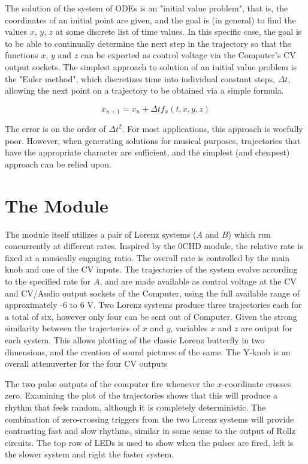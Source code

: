\documentclass{tufte-handout}
\begin{document}
The solution of the system of ODEs is an "initial value problem", that is, the coordinates of an initial point are given, and the goal is (in general) to find the values $x$, $y$, $z$ at some discrete list of time values. In this specific case, the goal is to be able to continually determine the next step in the trajectory so that the functions $x$, $y$ and $z$ can be exported as control voltage via the Computer's CV output sockets.
The simplest approach to solution of an initial value problem is the "Euler method", which discretizes time into individual constant steps, $\Delta t$, allowing the next point on a trajectory to be obtained via a simple formula.

$$x_{n+1} = x_n + \Delta t f_{x}(t, x, y, z)$$

The error is on the order of ${\Delta t}^2$. For most applications, this approach is woefully poor. However, when generating solutions for musical purposes, trajectories that have the appropriate character are sufficient, and the simplest (and cheapest) approach can be relied upon.

\section{The Module}\label{sec:the_module}

The module itself utilizes a pair of Lorenz systems ($A$ and $B$) which run concurrently at different rates. Inspired by the 0CHD module, the relative rate is fixed at a musically engaging ratio. The overall rate is controlled by the main knob and one of the CV inputs. The trajectories of the system evolve according to the specified rate for $A$, and are made available as control voltage  at the CV and CV/Audio output sockets of the Computer, using the full available range of approximately -6 to 6 V. Two Lorenz systems produce three trajectories each for a total of six, however only four can be sent out of Computer. Given the strong similarity between the trajectories of $x$ and $y$, variables $x$ and $z$ are output for each system. This allows plotting of the classic Lorenz butterfly in two dimensions, and the creation of sound pictures of the same. The Y-knob is an overall attenuverter for the four CV outputs

The two pulse outputs of the computer fire whenever the $x$-coordinate crosses zero. Examining the plot of the trajectories shows that this will produce a rhythm that feels random, although it is completely deterministic. The combination of zero-crossing triggers from the two Lorenz systems will provide contrasting fast and slow rhythms, similar in some sense to the output of Rollz circuits. The top row of LEDs is used to show when the pulses are fired, left is the slower system and right the faster system.
\end{document}
